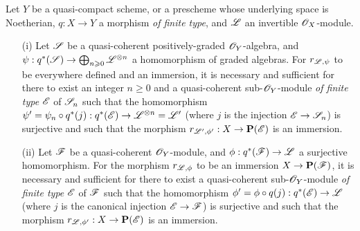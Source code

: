 \begin{proposition}[4.4.1]
\label{II.4.4.1}
Let $Y$ be a quasi-compact scheme, or a prescheme whose underlying space is Noetherian, $q:X\to Y$ a morphism \emph{of finite type}, and $\mathscr{L}$ an invertible $\mathscr{O}_X$-module.
\begin{enumerate}
  \item[\rm{(i)}] Let $\mathscr{S}$ be a quasi-coherent positively-graded $\mathscr{O}_Y$-algebra, and $\psi:q^*(\sh{S})\to\bigoplus_{n\geq0}\sh{L}^{\otimes n}$ a homomorphism of graded algebras.
    For $r_{\mathscr{L},\psi}$ to be everywhere defined and an immersion, it is necessary and
    sufficient for there to exist an integer $n\geq0$ and a quasi-coherent sub-$\mathscr{O}_Y$-module \emph{of finite type} $\mathscr{E}$ of $\mathscr{S}_n$ such that the homomorphism $\psi'=\psi_n\circ q^*(j):q^*(\sh{E})\to\sh{L}^{\otimes n}=\sh{L}'$ (where $j$ is the injection $\sh{E}\to\sh{S}_n$) is surjective and such that the morphism $r_{\sh{L}',\vphi'}:X\to\bb{P}(\sh{E})$ is an immersion.
  \item[\rm{(ii)}] Let $\mathscr{F}$ be a quasi-coherent $\mathscr{O}_Y$-module, and $\vphi:q^*(\sh{F})\to\sh{L}$ a surjective homomorphism.
    For the morphism $r_{\mathscr{L},\phi}$ to be an immersion $X\to\bb{P}(\sh{F})$, it is necessary and sufficient for there to exist a quasi-coherent sub-$\mathscr{O}_Y$-module \emph{of finite type} $\mathscr{E}$ of $\mathscr{F}$ such that the homomorphism $\vphi'=\vphi\circ q(j):q^*(\sh{E})\to\sh{L}$ (where $j$ is the canonical injection $\sh{E}\to\sh{F}$) is surjective and such that the morphism $r_{\sh{L},\vphi'}:X\to\bb{P}(\sh{E})$ is an immersion.
\end{enumerate}
\end{proposition}

